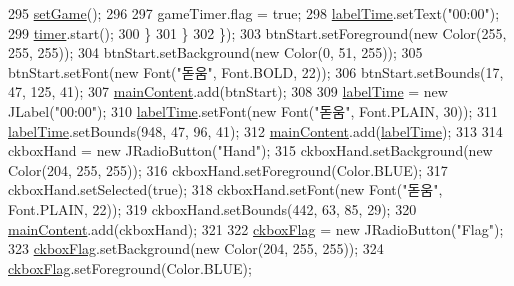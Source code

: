 \begin{DoxyCode}
295                     \hyperlink{classpkg_1_1main_frame_afee0fd4f159914a14f60d540051e99da}{setGame}();
296                 
297                     gameTimer.flag = \textcolor{keyword}{true};
298                     \hyperlink{classpkg_1_1main_frame_abd8e5f522ea7312634baf06ed61d5206}{labelTime}.setText(\textcolor{stringliteral}{"00:00"});
299                     \hyperlink{classpkg_1_1main_frame_aa204a940456c1c064259cafdd59434a6}{timer}.start();
300                 \}
301             \}
302         \});
303         btnStart.setForeground(\textcolor{keyword}{new} Color(255, 255, 255));
304         btnStart.setBackground(\textcolor{keyword}{new} Color(0, 51, 255));
305         btnStart.setFont(\textcolor{keyword}{new} Font(\textcolor{stringliteral}{"돋움"}, Font.BOLD, 22));
306         btnStart.setBounds(17, 47, 125, 41);
307         \hyperlink{classpkg_1_1main_frame_ac52666e4454808a34bc19f554aba065b}{mainContent}.add(btnStart);
308         
309         \hyperlink{classpkg_1_1main_frame_abd8e5f522ea7312634baf06ed61d5206}{labelTime} = \textcolor{keyword}{new} JLabel(\textcolor{stringliteral}{"00:00"});
310         \hyperlink{classpkg_1_1main_frame_abd8e5f522ea7312634baf06ed61d5206}{labelTime}.setFont(\textcolor{keyword}{new} Font(\textcolor{stringliteral}{"돋움"}, Font.PLAIN, 30));
311         \hyperlink{classpkg_1_1main_frame_abd8e5f522ea7312634baf06ed61d5206}{labelTime}.setBounds(948, 47, 96, 41);
312         \hyperlink{classpkg_1_1main_frame_ac52666e4454808a34bc19f554aba065b}{mainContent}.add(\hyperlink{classpkg_1_1main_frame_abd8e5f522ea7312634baf06ed61d5206}{labelTime});
313         
314         ckboxHand = \textcolor{keyword}{new} JRadioButton(\textcolor{stringliteral}{"Hand"});
315         ckboxHand.setBackground(\textcolor{keyword}{new} Color(204, 255, 255));
316         ckboxHand.setForeground(Color.BLUE);
317         ckboxHand.setSelected(\textcolor{keyword}{true});
318         ckboxHand.setFont(\textcolor{keyword}{new} Font(\textcolor{stringliteral}{"돋움"}, Font.PLAIN, 22));
319         ckboxHand.setBounds(442, 63, 85, 29);
320         \hyperlink{classpkg_1_1main_frame_ac52666e4454808a34bc19f554aba065b}{mainContent}.add(ckboxHand);
321         
322         \hyperlink{classpkg_1_1main_frame_aa5f83e91dbc66938adbeb69d07446101}{ckboxFlag} = \textcolor{keyword}{new} JRadioButton(\textcolor{stringliteral}{"Flag"});
323         \hyperlink{classpkg_1_1main_frame_aa5f83e91dbc66938adbeb69d07446101}{ckboxFlag}.setBackground(\textcolor{keyword}{new} Color(204, 255, 255));
324         \hyperlink{classpkg_1_1main_frame_aa5f83e91dbc66938adbeb69d07446101}{ckboxFlag}.setForeground(Color.BLUE);

\end{DoxyCode}
